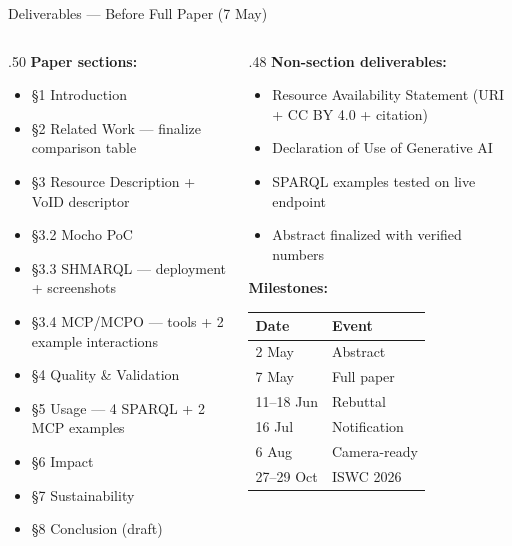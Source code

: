 \documentclass[xcolor,aspectratio=169,compress]{beamer}
\begin{document}
\begin{frame}[shrink=10]{Deliverables --- Before Full Paper (7 May)}
  \small
  \begin{columns}[t]
    \begin{column}{.50\textwidth}
      \textbf{Paper sections:}
      \begin{itemize}\setlength{\itemsep}{2pt}
        \item[$\square$] §1 Introduction
        \item[$\square$] §2 Related Work --- finalize comparison table
        \item[$\square$] §3 Resource Description + VoID descriptor
        \item[$\square$] §3.2 Mocho PoC
        \item[$\square$] §3.3 SHMARQL --- deployment + screenshots
        \item[$\square$] §3.4 MCP/MCPO --- tools + 2 example interactions
        \item[$\square$] §4 Quality \& Validation
        \item[$\square$] §5 Usage --- 4 SPARQL + 2 MCP examples
        \item[$\checkmark$] §6 Impact
        \item[$\checkmark$] §7 Sustainability
        \item[$\checkmark$] §8 Conclusion (draft)
      \end{itemize}
    \end{column}
    \begin{column}{.48\textwidth}
      \textbf{Non-section deliverables:}
      \begin{itemize}\setlength{\itemsep}{2pt}
        \item[$\square$] Resource Availability Statement (URI + CC BY 4.0 + citation)
        \item[$\square$] Declaration of Use of Generative AI
        \item[$\square$] SPARQL examples tested on live endpoint
        \item[$\square$] Abstract finalized with verified numbers
      \end{itemize}
      \smallskip
      \textbf{Milestones:}
      \footnotesize
      \begin{tabular}{ll}
        \toprule
        Date & Event \\
        \midrule
        2 May   & Abstract \\
        7 May   & Full paper \\
        11--18 Jun & Rebuttal \\
        16 Jul  & Notification \\
        6 Aug   & Camera-ready \\
        27--29 Oct & ISWC 2026 \\
        \bottomrule
      \end{tabular}
    \end{column}
  \end{columns}
\end{frame}

\end{document}
